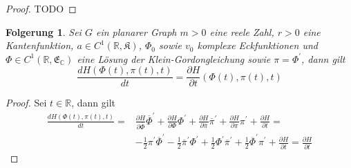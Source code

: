 \documentclass[11pt,a4paper,leqno]{report}
\newtheorem{corollary}[theorem]{Folgerung}
\numberwithin{equation}{chapter}
\begin{document}
\begin{proof}
TODO
\end{proof}

\begin{corollary}
Sei $G$ ein planarer Graph $m>0$ eine reele Zahl, $r>0$ eine Kantenfunktion, $a\in C^1(\mathbb{R}, \mathfrak{K})$, $\Phi_0$ sowie $v_0$ komplexe Eckfunktionen und $\Phi\in C^1(\mathbb{R}, \mathfrak{E}_\mathbb{C})$ eine L\"osung der Klein-Gordongleichung sowie $\pi=\Phi^\prime$, dann gilt
\begin{equation}
	\frac{dH(\Phi(t), \pi(t),t)}{dt} = \frac{\partial H}{\partial t}(\Phi(t), \pi(t),t)
\end{equation}
\end{corollary}
\begin{proof}
	Sei $t\in\mathbb{R}$, dann gilt
	\begin{align*}
\frac{dH(\Phi(t), \pi(t),t)}{dt}=&\frac{\partial H}{\partial \overline{\Phi}}\overline{\Phi}^\prime + \frac{\partial H}{\partial \Phi}\Phi^\prime +\frac{\partial H}{\partial \overline{\pi}}\overline{\pi}^\prime + \frac{\partial H}{\partial \pi}\pi^\prime + \frac{\partial H}{\partial t}=\\
&-\frac{1}{2}\pi^\prime\overline{\Phi}^\prime  -\frac{1}{2}\overline{\pi}^\prime\Phi^\prime +\frac{1}{2}\Phi^\prime\overline{\pi}^\prime + \frac{1}{2}\overline{\Phi}^\prime\pi^\prime + \frac{\partial H}{\partial t}=\frac{\partial H}{\partial t}
	\end{align*}
\end{proof}
\end{document}
